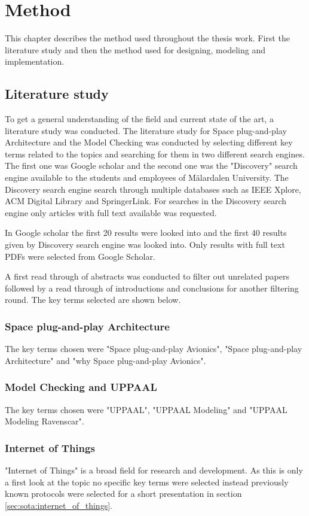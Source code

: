 \chapter{Method}\label{ch:method}
This chapter describes the method used throughout the thesis work. First
the literature study and then the method used for designing, modeling and
implementation.

\section{Literature study}
To get a general understanding of the field and current state of the art, a
literature study was conducted. The literature study for Space plug-and-play
Architecture and the Model Checking was conducted by selecting different key
terms related to the topics and searching for them in two different search
engines. The first one was Google scholar and the second one was the
"Discovery" search engine available to the students and employees of
M\"{a}lardalen University. The Discovery search engine search through multiple
databases such as IEEE Xplore, ACM Digital Library and SpringerLink. For
searches in the Discovery search engine only articles with full text available
was requested.

In Google scholar the first 20 results were looked into and the first 40
results given by Discovery search engine was looked into. Only results with
full text PDFs were selected from Google Scholar.

A first read through of abstracts was conducted to filter out unrelated
papers followed by a read through of introductions and conclusions for
another filtering round. The key terms selected are shown below.

\subsection{Space plug-and-play Architecture}
The key terms chosen were "Space plug-and-play Avionics", "Space
plug-and-play Architecture" and "why Space plug-and-play Avionics".

\subsection{Model Checking and UPPAAL}
The key terms chosen were "UPPAAL", "UPPAAL Modeling" and "UPPAAL Modeling
Ravenscar".

\subsection{Internet of Things}
"Internet of Things" is a broad field for research and development. As this is
only a first look at the topic no specific key terms were selected instead
previously known protocols were selected for a short presentation in section
\ref{sec:sota:internet_of_things}.

